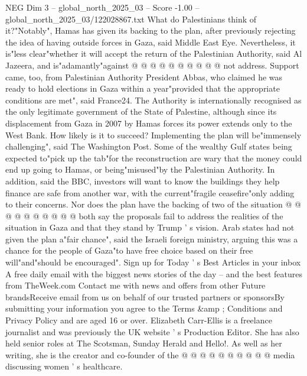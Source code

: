 \begin{textsample}{NEG Dim 3 – global\_north\_2025\_03 – Score -1.00 – global\_north\_2025\_03/122028867.txt}
What do Palestinians think of it?"Notably", Hamas has given its backing to the plan, after previously rejecting the idea of having outside forces in Gaza, said Middle East Eye.
Nevertheless, it is"less clear"whether it will accept the return of the Palestinian Authority, said Al Jazeera, and is"adamantly"against @ @ @ @ @ @ @ @ @ @ not address.
Support came, too, from Palestinian Authority President Abbas, who claimed he was ready to hold elections in Gaza within a year"provided that the appropriate conditions are met", said France24.
The Authority is internationally recognised as the only legitimate government of the State of Palestine, although since its displacement from Gaza in 2007 by Hamas forces its power extends only to the West Bank.
How likely is it to succeed?
Implementing the plan will be"immensely challenging", said The Washington Post.
Some of the wealthy Gulf states being expected to"pick up the tab"for the reconstruction are wary that the money could end up going to Hamas, or being"misused"by the Palestinian Authority.
In addition, said the BBC, investors will want to know the buildings they help finance are safe from another war, with the current"fragile ceasefire"only adding to their concerns.
Nor does the plan have the backing of two of the situation @ @ @ @ @ @ @ @ @ @ both say the proposals fail to address the realities of the situation in Gaza and that they stand by Trump ' s vision.
Arab states had not given the plan a"fair chance", said the Israeli foreign ministry, arguing this was a chance for the people of Gaza"to have free choice based on their free will"and"should be encouraged".
Sign up for Today ' s Best Articles in your inbox A free daily email with the biggest news stories of the day -- and the best features from TheWeek.com Contact me with news and offers from other Future brandsReceive email from us on behalf of our trusted partners or sponsorsBy submitting your information you agree to the Terms \&amp ; Conditions and Privacy Policy and are aged 16 or over.
Elizabeth Carr-Ellis is a freelance journalist and was previously the UK website ' s Production Editor.
She has also held senior roles at The Scotsman, Sunday Herald and Hello!.
As well as her writing, she is the creator and co-founder of the @ @ @ @ @ @ @ @ @ @ media discussing women ' s healthcare.

\end{textsample}
